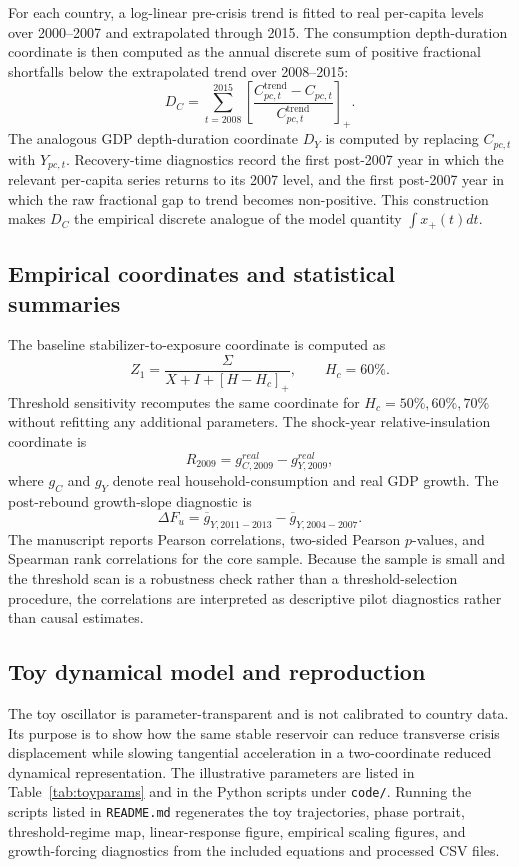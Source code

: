 \documentclass[11pt]{article}
\begin{document}
For each country, a log-linear pre-crisis trend is fitted to real per-capita levels over 2000--2007 and extrapolated through 2015. The consumption depth-duration coordinate is then computed as the annual discrete sum of positive fractional shortfalls below the extrapolated trend over 2008--2015:
\begin{equation}
D_C=\sum_{t=2008}^{2015}
\left[\frac{C^{\mathrm{trend}}_{pc,t}-C_{pc,t}}{C^{\mathrm{trend}}_{pc,t}}\right]_+ .
\label{eq:DCmethods}
\end{equation}
The analogous GDP depth-duration coordinate $D_Y$ is computed by replacing $C_{pc,t}$ with $Y_{pc,t}$. Recovery-time diagnostics record the first post-2007 year in which the relevant per-capita series returns to its 2007 level, and the first post-2007 year in which the raw fractional gap to trend becomes non-positive. This construction makes $D_C$ the empirical discrete analogue of the model quantity $\int x_+(t)dt$.

\subsection{Empirical coordinates and statistical summaries}
The baseline stabilizer-to-exposure coordinate is computed as
\begin{equation}
Z_1=\frac{\Sigma}{X+I+[H-H_c]_+}, \qquad H_c=60\% .
\end{equation}
Threshold sensitivity recomputes the same coordinate for $H_c=50\%,60\%,70\%$ without refitting any additional parameters. The shock-year relative-insulation coordinate is
\begin{equation}
R_{2009}=g^{real}_{C,2009}-g^{real}_{Y,2009},
\end{equation}
where $g_C$ and $g_Y$ denote real household-consumption and real GDP growth. The post-rebound growth-slope diagnostic is
\begin{equation}
\Delta F_u=\overline{g}_{Y,2011-2013}-\overline{g}_{Y,2004-2007} .
\end{equation}
The manuscript reports Pearson correlations, two-sided Pearson $p$-values, and Spearman rank correlations for the core sample. Because the sample is small and the threshold scan is a robustness check rather than a threshold-selection procedure, the correlations are interpreted as descriptive pilot diagnostics rather than causal estimates.

\subsection{Toy dynamical model and reproduction}
The toy oscillator is parameter-transparent and is not calibrated to country data. Its purpose is to show how the same stable reservoir can reduce transverse crisis displacement while slowing tangential acceleration in a two-coordinate reduced dynamical representation. The illustrative parameters are listed in Table~\ref{tab:toyparams} and in the Python scripts under \texttt{code/}. Running the scripts listed in \texttt{README.md} regenerates the toy trajectories, phase portrait, threshold-regime map, linear-response figure, empirical scaling figures, and growth-forcing diagnostics from the included equations and processed CSV files.
\end{document}
